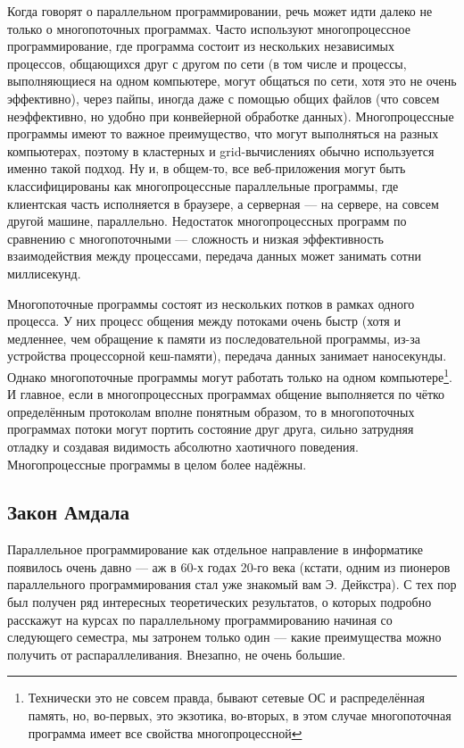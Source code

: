 \documentclass[a5paper]{article}
\begin{document}
Когда говорят о параллельном программировании, речь может идти далеко не только о многопоточных программах. Часто используют многопроцессное программирование, где программа состоит из нескольких независимых процессов, общающихся друг с другом по сети (в том числе и процессы, выполняющиеся на одном компьютере, могут общаться по сети, хотя это не очень эффективно), через пайпы, иногда даже с помощью общих файлов (что совсем неэффективно, но удобно при конвейерной обработке данных). Многопроцессные программы имеют то важное преимущество, что могут выполняться на разных компьютерах, поэтому в кластерных и grid-вычислениях обычно используется именно такой подход. Ну и, в общем-то, все веб-приложения могут быть классифицированы как многопроцессные параллельные программы, где клиентская часть исполняется в браузере, а серверная --- на сервере, на совсем другой машине, параллельно. Недостаток многопроцессных программ по сравнению с многопоточными --- сложность и низкая эффективность взаимодействия между процессами, передача данных может занимать сотни миллисекунд.

Многопоточные программы состоят из нескольких потков в рамках одного процесса. У них процесс общения между потоками очень быстр (хотя и медленнее, чем обращение к памяти из последовательной программы, из-за устройства процессорной кеш-памяти), передача данных занимает наносекунды. Однако многопоточные программы могут работать только на одном компьютере\footnote{Технически это не совсем правда, бывают сетевые ОС и распределённая память, но, во-первых, это экзотика, во-вторых, в этом случае многопоточная программа имеет все свойства многопроцессной}. И главное, если в многопроцессных программах общение выполняется по чётко определённым протоколам вполне понятным образом, то в многопоточных программах потоки могут портить состояние друг друга, сильно затрудняя отладку и создавая видимость абсолютно хаотичного поведения. Многопроцессные программы в целом более надёжны.

\subsection{Закон Амдала}

Параллельное программирование как отдельное направление в информатике появилось очень давно --- аж в 60-х годах 20-го века (кстати, одним из пионеров параллельного программирования стал уже знакомый вам Э. Дейкстра). С тех пор был получен ряд интересных теоретических результатов, о которых подробно расскажут на курсах по параллельному программированию начиная со следующего семестра, мы затронем только один --- какие преимущества можно получить от распараллеливания. Внезапно, не очень большие.
\end{document}

